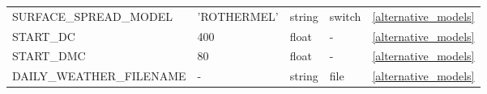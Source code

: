 \begin{landscape}
\begin{center}
\begin{longtable}{lllll}
SURFACE\_SPREAD\_MODEL                       & 'ROTHERMEL'                & string                 & switch                             & \ref{alternative_models}             \\
START\_DC                                    & 400                        & float                  & -                                  & \ref{alternative_models}             \\
START\_DMC                                   & 80                         & float                  & -                                  & \ref{alternative_models}             \\
DAILY\_WEATHER\_FILENAME                     & -                          & string                 & file                               & \ref{alternative_models}             \\


\end{longtable}
\end{center}
\end{landscape}
